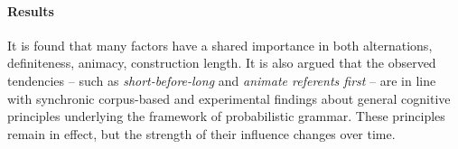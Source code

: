 \begin{svgraybox}
  \vspace{-\baselineskip}\paragraph{Results}\vspace{-0.5\baselineskip}

  It is found that many factors have a shared importance in both alternations, \eg definiteness, animacy, construction length.
  It is also argued that the observed tendencies -- such as \textit{short-before-long} and \textit{animate referents first} -- are in line with synchronic corpus-based and experimental findings about general cognitive principles underlying the framework of probabilistic grammar.
  These principles remain in effect, but the strength of their influence changes over time.

\end{svgraybox}

\newpage

